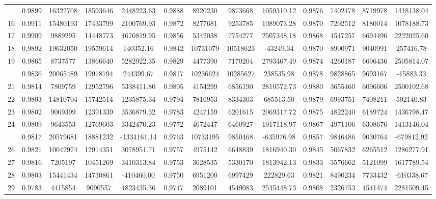 \documentclass[
  12pt,
]{article}
\begin{document}
\begin{longtable}[t]{lcccccccccccc}
\addlinespace
15 & 0.9899 & 16322708 & 18593646 & 2448223.63 & 0.9888 & 8920230 & 9873668 & 1059310.12 & 0.9876 & 7402478 & 8719978 & 1418138.04\\
16 & 0.9911 & 15480193 & 17433799 & 2100769.93 & 0.9872 & 8277681 & 9253785 & 1089073.28 & 0.9870 & 7202512 & 8180014 & 1078188.73\\
17 & 0.9909 & 9889295 & 14448773 & 4670819.95 & 0.9856 & 5342038 & 7754277 & 2507348.18 & 0.9868 & 4547257 & 6694496 & 2222025.60\\
18 & 0.9892 & 19632050 & 19559614 & 140352.16 & 0.9842 & 10731079 & 10518623 & -43249.34 & 0.9870 & 8900971 & 9040991 & 257416.78\\
19 & 0.9865 & 8737577 & 13866640 & 5282922.35 & 0.9829 & 4477390 & 7170204 & 2793467.49 & 0.9874 & 4260187 & 6696436 & 2505814.07\\
\addlinespace
20 & 0.9836 & 20065489 & 19978794 & 244399.67 & 0.9817 & 10236624 & 10285627 & 238535.98 & 0.9878 & 9828865 & 9693167 & -15883.33\\
21 & 0.9814 & 7809759 & 12952796 & 5338411.80 & 0.9805 & 4154299 & 6856190 & 2810572.73 & 0.9880 & 3655460 & 6096606 & 2500102.68\\
22 & 0.9803 & 14810704 & 15742514 & 1235875.34 & 0.9794 & 7816953 & 8334303 & 685513.50 & 0.9879 & 6993751 & 7408211 & 502140.83\\
23 & 0.9802 & 9069399 & 12391339 & 3536879.32 & 0.9783 & 4247159 & 6201615 & 2069317.72 & 0.9875 & 4822240 & 6189724 & 1436798.47\\
24 & 0.9809 & 9643553 & 12769603 & 3342470.23 & 0.9772 & 4672447 & 6460927 & 1917118.97 & 0.9867 & 4971106 & 6308676 & 1413146.04\\
\addlinespace
25 & 0.9817 & 20579681 & 18881232 & -1334161.14 & 0.9763 & 10733195 & 9850468 & -635976.98 & 0.9857 & 9846486 & 9030764 & -679812.92\\
26 & 0.9821 & 10042974 & 12914351 & 3078951.71 & 0.9757 & 4975142 & 6648839 & 1816940.30 & 0.9845 & 5067832 & 6265512 & 1286277.91\\
27 & 0.9816 & 7205197 & 10451269 & 3410313.84 & 0.9753 & 3628535 & 5330170 & 1813942.13 & 0.9833 & 3576662 & 5121099 & 1617789.54\\
28 & 0.9803 & 15441434 & 14730861 & -410460.00 & 0.9750 & 6951200 & 6997429 & 222829.63 & 0.9821 & 8490234 & 7733432 & -610338.67\\
29 & 0.9783 & 4415854 & 9090557 & 4823435.36 & 0.9747 & 2089101 & 4549083 & 2545448.73 & 0.9808 & 2326753 & 4541474 & 2281509.45\\

\end{longtable}
\end{document}
